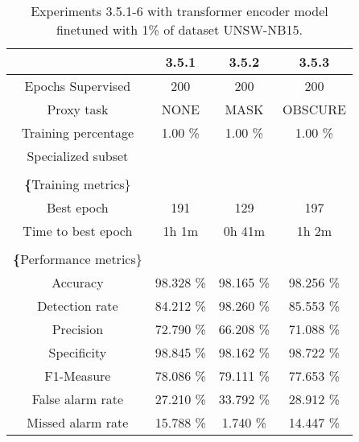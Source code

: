 \begin{table}[htb]
    \centering
    \begin{tabular}{@{}cccc@{}}
        \toprule
         & 3.5.1 & 3.5.2 & 3.5.3 \\
        \midrule
        Epochs Supervised &  200 &  200 &  200 \\
        Proxy task &  NONE &  MASK &  OBSCURE \\
        Training percentage &  1.00 \% &  1.00 \% &  1.00 \% \\
        Specialized subset &   &   &   \\
         \\
        \textbf\{Training metrics\} &  &  &  \\
        Best epoch &  191 &  129 &  197 \\
        Time to best epoch &  1h 1m &  0h 41m &  1h 2m \\
         \\
        \textbf\{Performance metrics\} &  &  &  \\
        Accuracy &  98.328 \% &  98.165 \% &  98.256 \% \\
        Detection rate &  84.212 \% &  98.260 \% &  85.553 \% \\
        Precision &  72.790 \% &  66.208 \% &  71.088 \% \\
        Specificity &  98.845 \% &  98.162 \% &  98.722 \% \\
        F1-Measure &  78.086 \% &  79.111 \% &  77.653 \% \\
        False alarm rate &  27.210 \% &  33.792 \% &  28.912 \% \\
        Missed alarm rate &  15.788 \% &  1.740 \% &  14.447 \% \\
        \bottomrule
    \end{tabular}
    \caption{Experiments 3.5.1-6 with transformer encoder model finetuned with 1\% of dataset UNSW-NB15.}
    \label{table:results:lstm:stats_flows15_10}
\end{table}